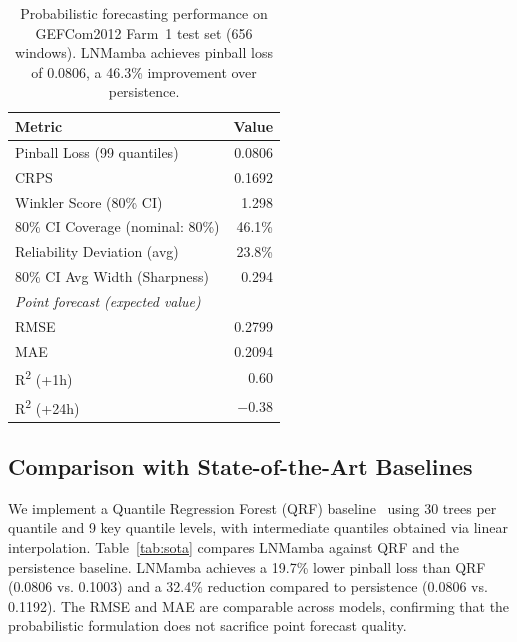 \documentclass[review]{elsarticle}
\begin{document}
\begin{table}[H]
\centering
\caption{Probabilistic forecasting performance on GEFCom2012 Farm~1 test set (656 windows). LNMamba achieves pinball loss of 0.0806, a 46.3\% improvement over persistence.}
\label{tab:main_results}
\begin{tabular}{@{}lr@{}}
\toprule
\textbf{Metric} & \textbf{Value} \\
\midrule
Pinball Loss (99 quantiles) & 0.0806 \\
CRPS & 0.1692 \\
Winkler Score (80\% CI) & 1.298 \\
80\% CI Coverage (nominal: 80\%) & 46.1\% \\
Reliability Deviation (avg) & 23.8\% \\
80\% CI Avg Width (Sharpness) & 0.294 \\
\midrule
\emph{Point forecast (expected value)} & \\
RMSE & 0.2799 \\
MAE & 0.2094 \\
R\textsuperscript{2} (+1h) & 0.60 \\
R\textsuperscript{2} (+24h) & $-$0.38 \\
\bottomrule
\end{tabular}
\end{table}

\subsection{Comparison with State-of-the-Art Baselines}

We implement a Quantile Regression Forest (QRF) baseline~\cite{meinshausen2006quantile} using 30 trees per quantile and 9 key quantile levels, with intermediate quantiles obtained via linear interpolation. Table~\ref{tab:sota} compares LNMamba against QRF and the persistence baseline. LNMamba achieves a 19.7\% lower pinball loss than QRF (0.0806 vs. 0.1003) and a 32.4\% reduction compared to persistence (0.0806 vs. 0.1192). The RMSE and MAE are comparable across models, confirming that the probabilistic formulation does not sacrifice point forecast quality.
\end{document}
